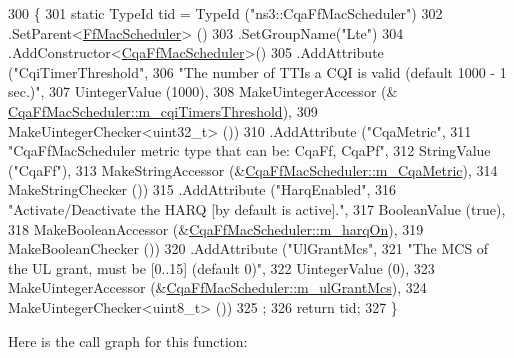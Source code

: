 \begin{DoxyCode}
300 \{
301   \textcolor{keyword}{static} TypeId tid = TypeId (\textcolor{stringliteral}{"ns3::CqaFfMacScheduler"})
302     .SetParent<\hyperlink{classns3_1_1FfMacScheduler_aa4c8ce28dbba2c19ff3328533c444045}{FfMacScheduler}> ()
303     .SetGroupName(\textcolor{stringliteral}{"Lte"})
304     .AddConstructor<\hyperlink{classns3_1_1CqaFfMacScheduler_ad7df3a4ee9e26114dad4d8b9572be9f8}{CqaFfMacScheduler}>()
305     .AddAttribute (\textcolor{stringliteral}{"CqiTimerThreshold"},
306                    \textcolor{stringliteral}{"The number of TTIs a CQI is valid (default 1000 - 1 sec.)"},
307                    UintegerValue (1000),
308                    MakeUintegerAccessor (&
      \hyperlink{classns3_1_1CqaFfMacScheduler_ab2ea609b39ce10062f2bdd8027dd6edd}{CqaFfMacScheduler::m\_cqiTimersThreshold}),
309                    MakeUintegerChecker<uint32\_t> ())
310     .AddAttribute (\textcolor{stringliteral}{"CqaMetric"},
311                    \textcolor{stringliteral}{"CqaFfMacScheduler metric type that can be: CqaFf, CqaPf"},
312                    StringValue (\textcolor{stringliteral}{"CqaFf"}),
313                    MakeStringAccessor (&\hyperlink{classns3_1_1CqaFfMacScheduler_aed5322f441dd060a332fe6e34c0d7d7c}{CqaFfMacScheduler::m\_CqaMetric}),
314                    MakeStringChecker ())
315     .AddAttribute (\textcolor{stringliteral}{"HarqEnabled"},
316                    \textcolor{stringliteral}{"Activate/Deactivate the HARQ [by default is active]."},
317                    BooleanValue (\textcolor{keyword}{true}),
318                    MakeBooleanAccessor (&\hyperlink{classns3_1_1CqaFfMacScheduler_afcb424ab57ad0d96293a7970c0b55dcf}{CqaFfMacScheduler::m\_harqOn}),
319                    MakeBooleanChecker ())
320     .AddAttribute (\textcolor{stringliteral}{"UlGrantMcs"},
321                    \textcolor{stringliteral}{"The MCS of the UL grant, must be [0..15] (default 0)"},
322                    UintegerValue (0),
323                    MakeUintegerAccessor (&\hyperlink{classns3_1_1CqaFfMacScheduler_a6ecc5189910f7224f44baf74d8fa8684}{CqaFfMacScheduler::m\_ulGrantMcs}),
324                    MakeUintegerChecker<uint8\_t> ())
325   ;
326   \textcolor{keywordflow}{return} tid;
327 \}
\end{DoxyCode}


Here is the call graph for this function\+:


